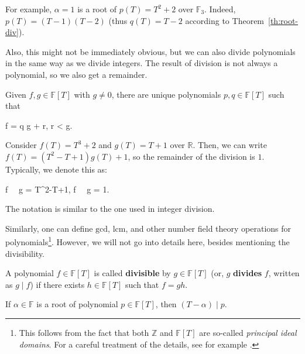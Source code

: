 \documentclass[../../book.tex]{subfiles}
\begin{document}
\begin{example}
    For example, $\alpha=1$ is a root of $p(T) = T^2+2$ over $\mathbb{F}_3$. Indeed, $p(T) = (T-1)(T-2)$ (thus $q(T) = T - 2$ according to Theorem~\ref{th:root-div}).
\end{example}

Also, this might not be immediately obvious, but we can also divide polynomials in the same way as we divide integers. The result of division is not always a polynomial, so we also get a remainder.

\begin{theorem}
    Given $f,g \in \mathbb{F}[T]$ with $g \neq 0$, there are unique polynomials $p,q \in \mathbb{F}[T]$ such that 
    \begin{xequation}
        f = q \cdot g + r,  \leq \deg r < \deg g.
    \end{xequation}
\end{theorem}

\begin{example}
    Consider $f(T) = T^3+2$ and $g(T) = T+1$ over $\mathbb{R}$. Then, we can write $f(T) = (T^2-T+1)g(T) + 1$, so the remainder of the division is $1$. Typically, we denote this as:
    \begin{xequation*}
        f \,  \, g = T^2-T+1, \quad f \,  \, g = 1.
    \end{xequation*}

    The notation is similar to the one used in integer division.
\end{example}

Similarly, one can define $\text{gcd}$, $\text{lcm}$, and other number field theory operations for polynomials\footnote{This follows from the fact that both $\mathbb{Z}$ and $\mathbb{F}[T]$ are so-called \textit{principal ideal domains}. For a careful treatment of the details, see for example \cite[Chapters 1 \& 2]{ireland}.}. However, we will not go into details here, besides mentioning the divisibility.

\begin{definition}
    A polynomial $f \in \mathbb{F}[T]$ is called \textbf{divisible} by $g \in \mathbb{F}[T]$ (or, $g$ \textbf{divides} $f$, written as $g \mid f$) if there exists $h \in \mathbb{F}[T]$ such that $f=gh$.
\end{definition}

\begin{proposition}
    If $\alpha \in \mathbb{F}$ is a root of polynomial $p \in \mathbb{F}[T]$, then $(T-\alpha) \mid p$.
\end{proposition}
\end{document}
